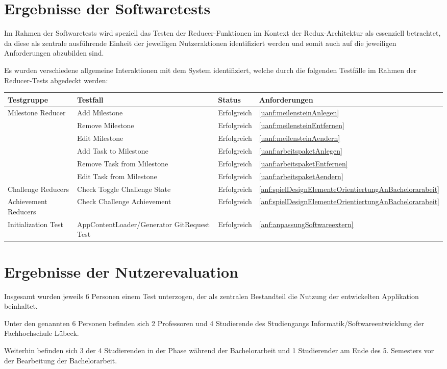 \documentclass[bibliography=totoc,listof=totoc,BCOR=5mm,DIV=12,oneside]{scrbook}
\begin{document}
{\section{Ergebnisse der Softwaretests}
\par Im Rahmen der Softwaretests wird speziell das Testen der Reducer-Funktionen im Kontext der Redux-Architektur als essenziell betrachtet, da diese als zentrale ausführende Einheit der jeweiligen Nutzeraktionen identifiziert werden und somit auch auf die jeweiligen Anforderungen abzubilden sind.
\par \bigskip Es wurden verschiedene allgemeine Interaktionen mit dem System identifiziert, welche durch die folgenden Testfälle im Rahmen der Reducer-Tests abgedeckt werden: 

\bigskip
\begin{tabularx}{\textwidth}{l|X|l|l}
	\toprule
	\textbf{Testgruppe} & \textbf{Testfall} & \textbf{Status} & \textbf{Anforderungen}\\ 
	\midrule
 	Milestone Reducer & Add Milestone & Erfolgreich & \ref{uanf:meilensteinAnlegen}\\ 
 	& Remove Milestone & Erfolgreich & \ref{uanf:meilensteinEntfernen}\\ 
 	& Edit Milestone & Erfolgreich & \ref{uanf:meilensteinAendern}\\
 	& Add Task to Milestone & Erfolgreich & \ref{uanf:arbeitspaketAnlegen}\\
 	& Remove Task from Milestone & Erfolgreich & \ref{uanf:arbeitspaketEntfernen}\\
 	& Edit Task from Milestone & Erfolgreich & \ref{uanf:arbeitspaketAendern}\\ 
 	\midrule
 	Challenge Reducers & Check Toggle Challenge State & Erfolgreich & \ref{anf:spielDesignElementeOrientiertungAnBachelorarabeit}\\
 	\midrule
 	Achievement Reducers & Check Challenge Achievement & Erfolgreich & \ref{anf:spielDesignElementeOrientiertungAnBachelorarabeit}\\
 	\midrule
 	Initialization Test & AppContentLoader/Generator GitRequest Test & Erfolgreich & \ref{anf:anpassungSoftwareextern}
 	\\ 
	\bottomrule
\end{tabularx}
\label{tab:reducertests}

\newpage
\section{Ergebnisse der Nutzerevaluation}
\par Insgesamt wurden jeweils 6 Personen einem Test unterzogen, der als zentralen Bestandteil die Nutzung der entwickelten Applikation beinhaltet. 
\par Unter den genannten 6 Personen befinden sich 2 Professoren und 4 Studierende des Studiengangs Informatik/Softwareentwicklung der Fachhochschule Lübeck. 
\par Weiterhin befinden sich 3 der 4 Studierenden in der Phase während der Bachelorarbeit und 1 Studierender am Ende des 5. Semesters vor der Bearbeitung der Bachelorarbeit.

}
\end{document}

